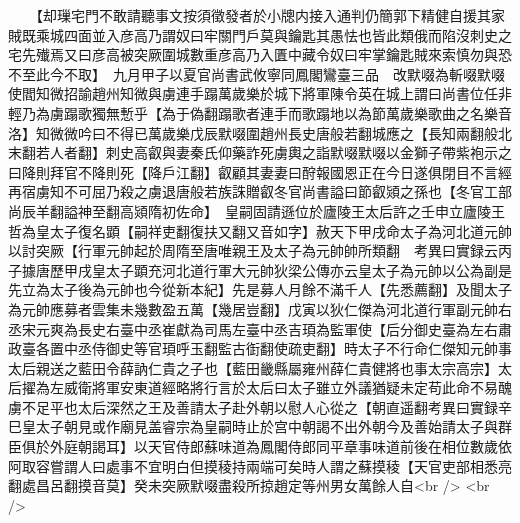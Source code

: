 　　【却璅宅門不敢請聽事文按須徵發者於小牕内接入通判仍簡郭下精健自援其家賊既乘城四面並入彦高乃謂奴曰牢關門戶莫與鑰匙其愚怯也皆此類俄而陷沒刺史之宅先殱焉又曰彦高被突厥圍城數重彦高乃入匱中藏令奴曰牢掌鑰匙賊來索慎勿與恐不至此今不取】　九月甲子以夏官尚書武攸寧同鳳閣鸞臺三品　改默啜為斬啜默啜使閻知微招諭趙州知微與虜連手蹋萬歲樂於城下將軍陳令英在城上謂曰尚書位任非輕乃為虜蹋歌獨無慙乎【為于偽翻蹋歌者連手而歌蹋地以為節萬歲樂歌曲之名樂音洛】知微微吟曰不得已萬歲樂戊辰默啜圍趙州長史唐般若翻城應之【長知兩翻般北末翻若人者翻】刺史高叡與妻秦氏仰藥詐死虜輿之詣默啜默啜以金獅子帶紫袍示之曰降則拜官不降則死【降戶江翻】叡顧其妻妻曰酧報國恩正在今日遂俱閉目不言經再宿虜知不可屈乃殺之虜退唐般若族誅贈叡冬官尚書謚曰節叡熲之孫也【冬官工部尚辰羊翻謚神至翻高熲隋初佐命】　皇嗣固請遜位於廬陵王太后許之壬申立廬陵王哲為皇太子復名顕【嗣祥吏翻復扶又翻又音如字】赦天下甲戌命太子為河北道元帥以討突厥【行軍元帥起於周隋至唐唯親王及太子為元帥帥所類翻　考異曰實録云丙子據唐歷甲戌皇太子顕充河北道行軍大元帥狄梁公傳亦云皇太子為元帥以公為副是先立為太子後為元帥也今從新本紀】先是募人月餘不滿千人【先悉薦翻】及聞太子為元帥應募者雲集未幾數盈五萬【幾居豈翻】戊寅以狄仁傑為河北道行軍副元帥右丞宋元爽為長史右臺中丞崔獻為司馬左臺中丞吉頊為監軍使【后分御史臺為左右肅政臺各置中丞侍御史等官頊呼玉翻監古衘翻使疏吏翻】時太子不行命仁傑知元帥事太后親送之藍田令薛訥仁貴之子也【藍田畿縣屬雍州薛仁貴健將也事太宗高宗】太后擢為左威衛將軍安東道經略將行言於太后曰太子雖立外議猶疑未定苟此命不易醜虜不足平也太后深然之王及善請太子赴外朝以慰人心從之【朝直遥翻考異曰實録辛巳皇太子朝見或作廟見盖睿宗為皇嗣時止於宫中朝謁不出外朝今及善始請太子與群臣俱於外庭朝謁耳】以天官侍郎蘇味道為鳳閣侍郎同平章事味道前後在相位數歲依阿取容嘗謂人曰處事不宜明白但摸稜持兩端可矣時人謂之蘇摸稜【天官吏部相悉亮翻處昌呂翻摸音莫】癸未突厥默啜盡殺所掠趙定等州男女萬餘人自<br />
<br />
